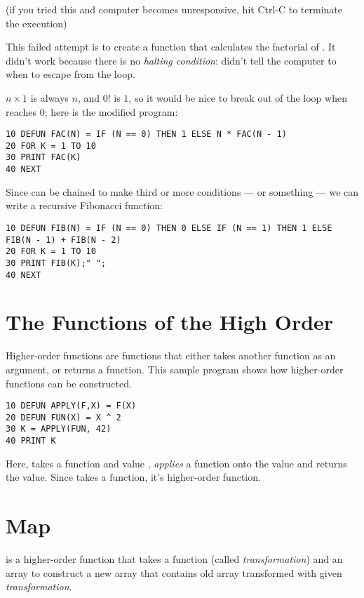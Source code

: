 (if you tried this and computer becomes unresponsive, hit Ctrl-C to terminate the execution)

This failed attempt is to create a function that calculates the factorial of . It didn't work because there is no \emph{halting condition}: didn't tell the computer to when to escape from the loop.

$n \times 1$ is always $n$, and $0!$ is $1$, so it would be nice to break out of the loop when  reaches $0$; here is the modified program:

\begin{lstlisting}
10 DEFUN FAC(N) = IF (N == 0) THEN 1 ELSE N * FAC(N - 1)
20 FOR K = 1 TO 10
30 PRINT FAC(K)
40 NEXT
\end{lstlisting}

Since  can be chained to make third or more conditions ---  or something --- we can write a recursive Fibonacci function:

\begin{lstlisting}
10 DEFUN FIB(N) = IF (N == 0) THEN 0 ELSE IF (N == 1) THEN 1 ELSE FIB(N - 1) + FIB(N - 2)
20 FOR K = 1 TO 10
30 PRINT FIB(K);" ";
40 NEXT
\end{lstlisting}

\section[Higher-order Function]{The Functions of the High Order}

Higher-order functions are functions that either takes another function as an argument, or returns a function. This sample program shows how higher-order functions can be constructed.

\begin{lstlisting}
10 DEFUN APPLY(F,X) = F(X)
20 DEFUN FUN(X) = X ^ 2
30 K = APPLY(FUN, 42)
40 PRINT K
\end{lstlisting}

Here,  takes a function  and value , \emph{applies} a function  onto the value  and returns the value. Since  takes a function, it's higher-order function.

\section[MAPping]{Map}

 is a higher-order function that takes a function (called \emph{transformation}) and an array to construct a new array that contains old array transformed with given \emph{transformation}.

